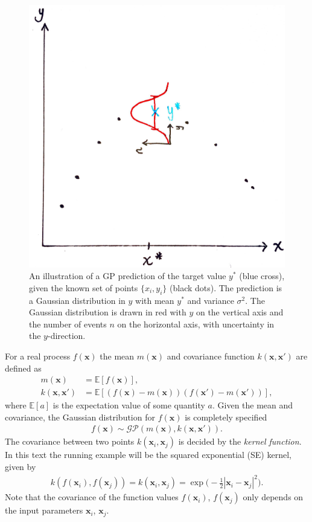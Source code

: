 \documentclass[twoside,english]{uiofysmaster}
\begin{document}
\begin{figure}
\centering
\includegraphics[scale=0.1]{GP_illustration_tegning.jpg}
\caption{An illustration of a GP prediction of the target value $y^*$ (blue cross), given the known set of points $\{x_i, y_i\}$ (black dots). The prediction is a Gaussian distribution in $y$ with mean $y^*$ and variance $\sigma^2$. The Gaussian distribution is drawn in red with $y$ on the vertical axis and the number of events $n$ on the horizontal axis, with uncertainty in the $y$-direction.}
\label{Fig:: gaussian process : GP illustration}
\end{figure}

For a real process $f(\textbf{x})$ the mean  $m(\textbf{x})$ and covariance function $k(\textbf{x}, \textbf{x}')$ are defined as
\begin{align}
m(\textbf{x}) &= \mathbb{E}[f(\textbf{x})],\\
k(\textbf{x}, \textbf{x}') &= \mathbb{E} [(f(\textbf{x}) - m(\textbf{x}))(f(\textbf{x}') - m(\textbf{x}'))],
\end{align}
where $\mathbb{E}[a]$ is the expectation value of some quantity $a$. Given the mean and covariance, the Gaussian distribution for $f(\textbf{x})$ is completely specified
\begin{align}
f(\textbf{x}) \sim \mathcal{GP}(m(\textbf{x}), k(\textbf{x}, \textbf{x}')).
\end{align}
The covariance between two points $k(\textbf{x}_i, \textbf{x}_j)$ is decided by the \textit{kernel function}. In this text the running example will be the squared exponential (SE) kernel, given by
\begin{align}
k(f(\textbf{x}_i), f(\textbf{x}_j)) = k(\textbf{x}_i, \textbf{x}_j) = \exp \Big( - \frac{1}{2} |\textbf{x}_i - \textbf{x}_j|^2 \Big).
\end{align}
Note that the covariance of the function values $f(\textbf{x}_i)$, $f(\textbf{x}_j)$ only depends on the input parameters $\textbf{x}_i$, $\textbf{x}_j$. 
\end{document}
